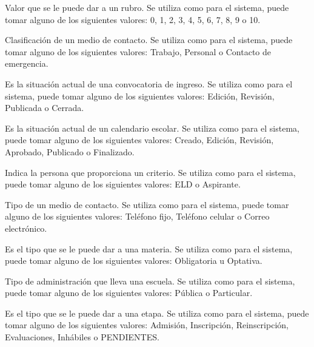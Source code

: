 \begin{description}
 Valor que se le puede dar a un rubro. Se utiliza como  para el sistema, puede tomar alguno de los siguientes valores: 0, 1, 2, 3, 4, 5, 6, 7, 8, 9 o 10.

 Clasificación de un medio de contacto. Se utiliza como  para el sistema, puede tomar alguno de los siguientes valores: Trabajo, Personal o Contacto de emergencia.

 Es la situación actual de una convocatoria de ingreso. Se utiliza como  para el sistema, puede tomar alguno de los siguientes valores: Edición, Revisión, Publicada o Cerrada.

 Es la situación actual de un calendario escolar. Se utiliza como  para el sistema, puede tomar alguno de los siguientes valores: Creado, Edición, Revisión, Aprobado, Publicado o Finalizado.

 Indica la persona que proporciona un criterio. Se utiliza como  para el sistema, puede tomar alguno de los siguientes valores: ELD o Aspirante.

 Tipo de un medio de contacto. Se utiliza como  para el sistema, puede tomar alguno de los siguientes valores: Teléfono fijo, Teléfono celular o Correo electrónico.

 Es el tipo que se le puede dar a una materia. Se utiliza como  para el sistema, puede tomar alguno de los siguientes valores: Obligatoria u Optativa.

 Tipo de administración que lleva una escuela. Se utiliza como  para el sistema, puede tomar alguno de los siguientes valores: Pública o Particular.

 Es el tipo que se le puede dar a una etapa. Se utiliza como  para el sistema, puede tomar alguno de los siguientes valores: Admisión, Inscripción, Reinscripción, Evaluaciones, Inhábiles o PENDIENTES.


\end{description}
